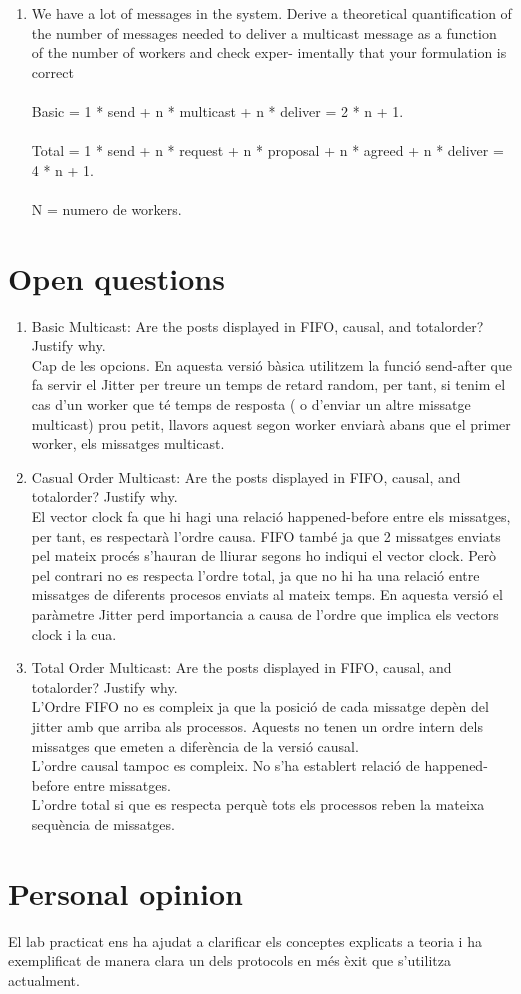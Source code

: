 \documentclass[a4paper, 10pt]{article}
\begin{document}
\begin{enumerate}
\\\item We have a lot of messages in the system. Derive a theoretical quantification of the number of messages needed to deliver a multicast message as a function of the number of workers and check exper- imentally that your formulation is correct\\\\
Basic = 1 * send + n * multicast + n * deliver = 2 * n + 1.\\\\
Total = 1 * send + n * request + n * proposal + n * agreed + n * deliver = 4 * n + 1.\\\\
N = numero de workers.

\end{enumerate}

\newpage
\section{Open questions}
\begin{enumerate}
\item Basic Multicast: Are the posts displayed in FIFO, causal, and totalorder?  Justify why.
\\Cap de les opcions. En aquesta versió bàsica utilitzem la funció send-after que fa servir el Jitter per treure un temps de retard random, per tant, si tenim el cas d'un worker que té temps de resposta ( o d'enviar un altre missatge multicast) prou petit, llavors aquest segon worker enviarà abans que el primer worker, els missatges multicast.
\item Casual Order Multicast: Are the posts displayed in FIFO, causal, and totalorder?  Justify why.
\\El vector clock fa que hi hagi una relació happened-before entre els missatges, per tant, es respectarà l'ordre causa. FIFO també ja que 2 missatges enviats pel mateix procés s'hauran de lliurar segons ho indiqui el vector clock. Però pel contrari no es respecta l'ordre total, ja que no hi ha una relació entre missatges de diferents procesos enviats al mateix temps.
En aquesta versió el paràmetre Jitter perd importancia a causa de l'ordre que implica els vectors clock i la cua.
\item Total Order Multicast: Are the posts displayed in FIFO, causal, and totalorder? Justify why.
\\L'Ordre FIFO no es compleix ja que la posició de cada missatge depèn del jitter amb que arriba als processos.
Aquests no tenen un ordre intern dels missatges que emeten a diferència de la versió causal.
\\L'ordre causal tampoc es compleix. No s'ha establert relació de happened-before entre missatges.
\\L'ordre total si que es respecta perquè tots els processos reben la mateixa sequència de missatges.

\end{enumerate}




\newpage
\section{Personal opinion}
El lab practicat ens ha ajudat a clarificar els conceptes explicats a teoria i ha exemplificat de manera clara
un dels protocols en més èxit que s'utilitza actualment.
\end{document}
